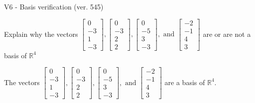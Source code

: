 \begin{exercise}
  \begin{exerciseTitle}V6 - Basis verification (ver. 545)\end{exerciseTitle}
  \begin{exerciseStatement}
    Explain why the vectors \(\left[\begin{array}{r}
0 \\
-3 \\
1 \\
-3
\end{array}\right] , \left[\begin{array}{r}
0 \\
-3 \\
2 \\
2
\end{array}\right] , \left[\begin{array}{r}
0 \\
-5 \\
3 \\
-3
\end{array}\right] , \text{ and } \left[\begin{array}{r}
-2 \\
-1 \\
4 \\
3
\end{array}\right]\) are or are not a basis of \(\mathbb{R}^4\)	


  \end{exerciseStatement}
  \begin{exerciseAnswer}
   The vectors \(\left[\begin{array}{r}
0 \\
-3 \\
1 \\
-3
\end{array}\right] , \left[\begin{array}{r}
0 \\
-3 \\
2 \\
2
\end{array}\right] , \left[\begin{array}{r}
0 \\
-5 \\
3 \\
-3
\end{array}\right] , \text{ and } \left[\begin{array}{r}
-2 \\
-1 \\
4 \\
3
\end{array}\right]\) 
  	 are  a basis of \(\mathbb{R}^4\).
  


  \end{exerciseAnswer}
\end{exercise}